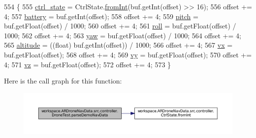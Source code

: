 \begin{DoxyCode}
554     \{
555         \hyperlink{classworkspace_1_1_a_r_drone_nav_data_1_1src_1_1controller_1_1_drone_test_aed0680aaf48f5df307af86a50472dbe8}{ctrl\_state} = CtrlState.\hyperlink{enumworkspace_1_1_a_r_drone_nav_data_1_1src_1_1controller_1_1_ctrl_state_a12e972814c520c7a3da99809b3c7973b}{fromInt}(buf.getInt(offset) >> 16);
556         offset += 4;
557         \hyperlink{classworkspace_1_1_a_r_drone_nav_data_1_1src_1_1controller_1_1_drone_test_a5c1afa51b8a7209525be502cbcbb2717}{battery} = buf.getInt(offset);
558         offset += 4;
559         \hyperlink{classworkspace_1_1_a_r_drone_nav_data_1_1src_1_1controller_1_1_drone_test_a5267867dd0cbed3adb619ea898ac0ea1}{pitch} = buf.getFloat(offset) / 1000;
560         offset += 4;
561         \hyperlink{classworkspace_1_1_a_r_drone_nav_data_1_1src_1_1controller_1_1_drone_test_a51d40a655d9e34719fbdfffcd025eaa5}{roll} = buf.getFloat(offset) / 1000;
562         offset += 4;
563         \hyperlink{classworkspace_1_1_a_r_drone_nav_data_1_1src_1_1controller_1_1_drone_test_a3a79d04620fe8a242fa225f6174cb2d6}{yaw} = buf.getFloat(offset) / 1000;
564         offset += 4;
565         \hyperlink{classworkspace_1_1_a_r_drone_nav_data_1_1src_1_1controller_1_1_drone_test_a96af0aa5257780f2230c98811fb0f8ba}{altitude} = ((float) buf.getInt(offset)) / 1000;
566         offset += 4;
567         \hyperlink{classworkspace_1_1_a_r_drone_nav_data_1_1src_1_1controller_1_1_drone_test_aee5b32437faf364431eb128b575fb0e8}{vx} = buf.getFloat(offset);
568         offset += 4;
569         \hyperlink{classworkspace_1_1_a_r_drone_nav_data_1_1src_1_1controller_1_1_drone_test_a3f83a92a77d084e233ab027708712b44}{vy} = buf.getFloat(offset);
570         offset += 4;
571         \hyperlink{classworkspace_1_1_a_r_drone_nav_data_1_1src_1_1controller_1_1_drone_test_ae3be43e32715a5b7ecaf2f1ff8ae4603}{vz} = buf.getFloat(offset);
572         offset += 4;
573     \}
\end{DoxyCode}


Here is the call graph for this function\+:\nopagebreak
\begin{figure}[H]
\begin{center}
\leavevmode
\includegraphics[width=350pt]{classworkspace_1_1_a_r_drone_nav_data_1_1src_1_1controller_1_1_drone_test_a92cb230a2831894de2a16fcd699223d1_cgraph}
\end{center}
\end{figure}





